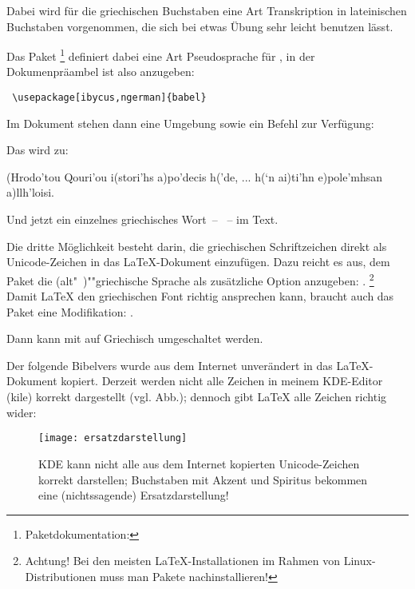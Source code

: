 Dabei wird für die griechischen Buchstaben eine Art Transkription in lateinischen Buchstaben
vorgenommen, die sich bei etwas Übung sehr leicht benutzen lässt.

Das Paket %
\footnote{Paketdokumentation: }
definiert dabei eine Art Pseudosprache für ,
in der Dokumenpräambel ist also anzugeben:

\begin{lstlisting}
 \usepackage[ibycus,ngerman]{babel}
\end{lstlisting}

Im Dokument stehen dann eine Umgebung  sowie ein Befehl 
zur Verfügung:


Das wird zu:

 \begin{ibycus}
  (Hrodo'tou Qouri’ou i(stori’hs a)po’decis h(’de,
  ...
  h(‘n ai)ti’hn e)pole’mhsan a)llh’loisi.
  \end{ibycus}

  Und jetzt ein einzelnes griechisches Wort~-- ~-- im Text.






Die dritte Möglichkeit besteht darin, die griechischen Schriftzeichen direkt als Unicode-Zeichen
in das \LaTeX -Dokument einzufügen. Dazu reicht es aus, dem Paket  die
(alt"~)""griechische Sprache als zusätzliche Option anzugeben:
 .%
\footnote{Achtung! Bei den meisten \LaTeX-Installationen im Rahmen von Linux-Distributionen muss
man Pakete nachinstallieren!}
Damit \LaTeX{} den griechischen Font richtig ansprechen kann, braucht auch das Paket 
eine Modifikation:  .

Dann kann mit  auf Griechisch umgeschaltet werden.

Der folgende Bibelvers wurde aus dem Internet unverändert in das \LaTeX-Dokument
kopiert. Derzeit werden nicht alle Zeichen in meinem KDE-Editor (kile) korrekt dargestellt (vgl. Abb.);
dennoch gibt \LaTeX{} alle Zeichen richtig wider:

\begin{figure}
 \texttt{[image: ersatzdarstellung]}
 \caption{KDE kann nicht alle aus dem Internet kopierten Unicode-Zeichen korrekt darstellen;
 Buchstaben mit Akzent und Spiritus bekommen eine (nichtssagende) Ersatzdarstellung!}
\end{figure}


